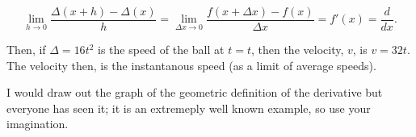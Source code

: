 \documentclass{article}
\begin{document}
\begin{definition}
 \[
   \lim_{h\to 0} \frac{\Delta(x+h)-\Delta(x)}{h} = \lim_{\Delta x \to 0} \frac{f(x+\Delta x)-f(x)}{\Delta x}=f'(x)=\frac{d}{dx}
 .\] 
\end{definition}

Then, if \( \Delta=16t^2 \) is the speed of the ball at $t=t$, then the velocity, $v$, is $v=32t$. The velocity then, is the instantanous speed (as a limit of average speeds). 

I would draw out the graph of the geometric definition of the derivative but everyone has seen it; it is an extremeply well known example, so use your imagination. 





\end{document}
